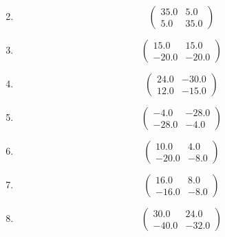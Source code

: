 \documentclass{article}%
\begin{document}
\begin{enumerate}[label=\arabic*)]
\[\]%
\item%
\[%
\begin{pmatrix}%
35.0&5.0\\%
5.0&35.0%
\end{pmatrix}%
\]%
\item%
\[%
\begin{pmatrix}%
15.0&15.0\\%
-20.0&-20.0%
\end{pmatrix}%
\]%
\item%
\[%
\begin{pmatrix}%
24.0&-30.0\\%
12.0&-15.0%
\end{pmatrix}%
\]%
\item%
\[%
\begin{pmatrix}%
-4.0&-28.0\\%
-28.0&-4.0%
\end{pmatrix}%
\]%
\item%
\[%
\begin{pmatrix}%
10.0&4.0\\%
-20.0&-8.0%
\end{pmatrix}%
\]%
\item%
\[%
\begin{pmatrix}%
16.0&8.0\\%
-16.0&-8.0%
\end{pmatrix}%
\]%
\item%
\[%
\begin{pmatrix}%
30.0&24.0\\%
-40.0&-32.0%
\end{pmatrix}%
\]%
\end{enumerate}

%
\end{document}

